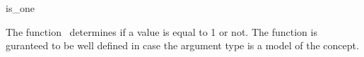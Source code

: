 \begin{ccRefFunction}{is_one}

\ccDefinition

The function \ccRefName\ determines if a value is equal to 1 or not.
The function is guranteed to be well defined in case the argument type 
is a model of the  concept. 


 {}


\ccSeeAlso

\\
\\

\end{ccRefFunction}
